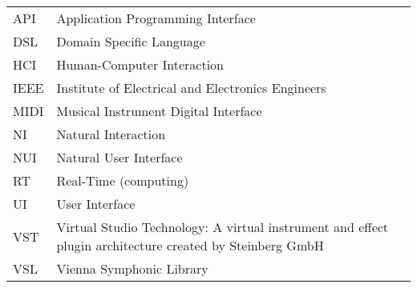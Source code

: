 \noindent

\begin{longtable}{@{}p{}p{}@{}}
API & Application Programming Interface \\
DSL & Domain Specific Language \\
HCI & Human-Computer Interaction \\
IEEE & Institute of Electrical and Electronics Engineers \\
MIDI & Musical Instrument Digital Interface \\
NI & Natural Interaction \\
NUI & Natural User Interface \\
RT & Real-Time (computing) \\
UI & User Interface \\
VST & Virtual Studio Technology: A virtual instrument and effect plugin architecture created by Steinberg GmbH \\
VSL & Vienna Symphonic Library

\end{longtable}
